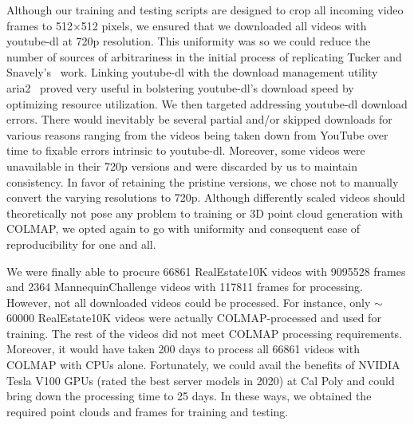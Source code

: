 Although our training and testing scripts are designed to crop all incoming video frames to 512$\times$512 pixels, we ensured that we downloaded all videos with youtube-dl at 720p resolution. This uniformity was so we could reduce the number of sources of arbitrariness in the initial process of replicating Tucker and Snavely's~\cite{single_view_mpi} work. Linking youtube-dl with the download management utility aria2~\cite{noauthor_aria2_2021} proved very useful in bolstering youtube-dl’s download speed by optimizing resource utilization. We then targeted addressing youtube-dl download errors. There would inevitably be several partial and/or skipped downloads for various reasons ranging from the videos being taken down from YouTube over time to fixable errors intrinsic to youtube-dl. Moreover, some videos were unavailable in their 720p versions and were discarded by us to maintain consistency. In favor of retaining the pristine versions, we chose not to manually convert the varying resolutions to 720p. Although differently scaled videos should theoretically not pose any problem to training or 3D point cloud generation with COLMAP, we opted again to go with uniformity and consequent ease of reproducibility for one and all.
    
We were finally able to procure 66861 RealEstate10K videos with 9095528 frames and 2364 MannequinChallenge videos with 117811 frames for processing. However, not all downloaded videos could be processed. For instance, only $\sim$60000 RealEstate10K videos were actually COLMAP-processed and used for training. The rest of the videos did not meet COLMAP processing requirements. Moreover, it would have taken 200 days to process all 66861 videos with COLMAP with CPUs alone. Fortunately, we could avail the benefits of NVIDIA Tesla V100 GPUs (rated the best server models in 2020) at Cal Poly and could bring down the processing time to 25 days. In these ways, we obtained the required point clouds and frames for training and testing.















